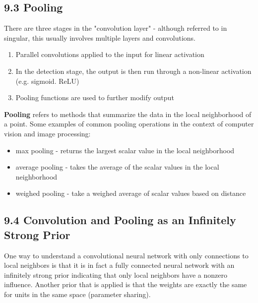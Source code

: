 \documentclass[a4paper]{report}
\begin{document}
\subsection{9.3 Pooling}
There are three stages in the "convolution layer" - although referred to in singular, this usually involves multiple layers and convolutions.
\begin{enumerate}
    \item Parallel convolutions applied to the input for linear activation
    \item In the detection stage, the output is then run through a non-linear activation (e.g. sigmoid. ReLU)
    \item Pooling functions are used to further modify output
\end{enumerate}
\textbf{Pooling} refers to methods that summarize the data in the local neighborhood of a point. Some examples of common pooling operations in the context of computer vision and image processing:
\begin{itemize}
    \item max pooling - returns the largest scalar value in the local neighborhood
    \item average pooling - takes the average of the scalar values in the local neighborhood
    \item weighed pooling - take a weighed average of scalar values based on distance
\end{itemize}

\subsection{9.4 Convolution and Pooling as an Infinitely Strong Prior}
One way to understand a convolutional neural network with only connections to local neighbors is that it is in fact a fully connected neural network with an infinitely strong prior indicating that only local neighbors have a nonzero influence. Another prior that is applied is that the weights are exactly the same for units in the same space (parameter sharing).
\end{document}
